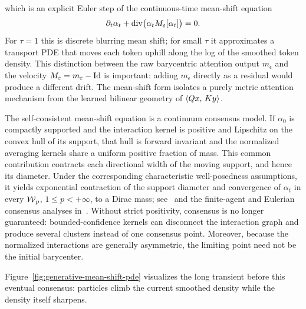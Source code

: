 which is an explicit Euler step of the continuous-time mean-shift equation
\[
	\partial_t\alpha_t+\operatorname{div}\bigl(\alpha_tM_\varepsilon[\alpha_t]\bigr)=0.
\]
For $\tau=1$ this is discrete blurring mean shift; for small $\tau$ it approximates a transport PDE that moves each token uphill along the log of the smoothed token density. This distinction between the raw barycentric attention output $m_\epsilon$ and the velocity $M_\varepsilon=m_\varepsilon-\mathrm{Id}$ is important: adding $m_\epsilon$ directly as a residual would produce a different drift. The mean-shift form isolates a purely metric attention mechanism from the learned bilinear geometry of $\langle Qx,\,Ky\rangle$.

\begin{rem}\label{rem-mean-shift-consensus}
The self-consistent mean-shift equation is a continuum consensus model. If $\alpha_0$ is compactly supported and the interaction kernel is positive and Lipschitz on the convex hull of its support, that hull is forward invariant and the normalized averaging kernels share a uniform positive fraction of mass. This common contribution contracts each directional width of the moving support, and hence its diameter. Under the corresponding characteristic well-posedness assumptions, it yields exponential contraction of the support diameter and convergence of $\alpha_t$ in every $\operatorname{\mathcal{W}}_p$, $1\leq p<+\infty$, to a Dirac mass; see~\citet{HegselmannKrause2002OpinionDynamics,Chen2015BlurringMeanShift,MotschTadmor2014Heterophilious} and the finite-agent and Eulerian consensus analyses in~\citet{BlondelHendrickxTsitsiklis2009Krause,CanutoFagnaniTilli2012EulerianKrause}. Without strict positivity, consensus is no longer guaranteed: bounded-confidence kernels can disconnect the interaction graph and produce several clusters instead of one consensus point. Moreover, because the normalized interactions are generally asymmetric, the limiting point need not be the initial barycenter.
\end{rem}

Figure~\ref{fig:generative-mean-shift-pde} visualizes the long transient before this eventual consensus: particles climb the current smoothed density while the density itself sharpens.

